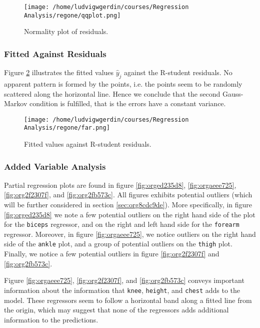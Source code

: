 \documentclass[11pt]{article}
\begin{document}
\begin{figure}[htbp]
\centering
\texttt{[image: /home/ludvigwgerdin/courses/Regression Analysis/regone/qqplot.png]}
\caption{\label{fig:org3bd71eb}
Normality plot of residuals.}
\end{figure}

\subsubsection{Fitted Against Residuals}
\label{sec:org9030f66}

Figure \ref{fig:org934167f} illustrates the fitted values \(\hat y_j\) against the R-student residuals. No apparent 
pattern is formed by the points, i.e. the points seem to be randomly scattered along the horizontal line.
Hence we conclude that the second Gauss-Markov condition is fulfilled, that is the errors have a constant 
variance.

\begin{figure}[htbp]
\centering
\texttt{[image: /home/ludvigwgerdin/courses/Regression Analysis/regone/far.png]}
\caption{\label{fig:org934167f}
Fitted values against R-student residuals.}
\end{figure}

\subsubsection{Added Variable Analysis}
\label{sec:orga3b868b}
Partial regression plots are found in figure \ref{fig:orged235d8}, \ref{fig:orgaeee725},
\ref{fig:org2f2307f}, and \ref{fig:org2fb573c}. All figures exhibits potential outliers 
(which will be further considered in section \ref{sec:org8cdc9de}).
More specifically, in figure \ref{fig:orged235d8} we note a 
few potential outliers on the right hand side of the plot for the \texttt{biceps} regressor, and on the
right and left hand side for the \texttt{forearm} regressor. Moreover, in figure \ref{fig:orgaeee725}, we 
notice outliers on the right hand side of the \texttt{ankle} plot, and a group of potential outliers on the
\texttt{thigh} plot. Finally, we notice a few potential outliers in figure \ref{fig:org2f2307f} and 
\ref{fig:org2fb573c}.

Figure \ref{fig:orgaeee725}, \ref{fig:org2f2307f}, and \ref{fig:org2fb573c} 
conveys important information about the information that \texttt{knee}, \texttt{height}, and
\texttt{chest} adds to the model. These regressors seem to follow a horizontal band along a fitted 
line from the origin, which may suggest that none of the regressors adds additional information 
to the predictions.
\end{document}
